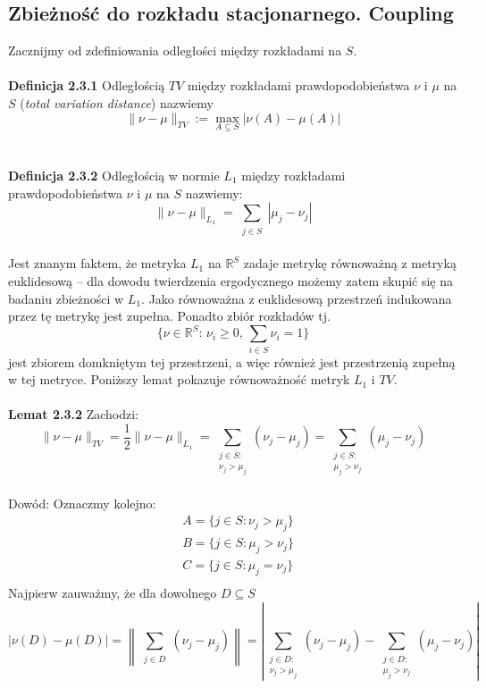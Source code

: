 \documentclass[a4paper]{article}
\begin{document}
\subsection{Zbieżność do rozkładu stacjonarnego. Coupling}
Zacznijmy od zdefiniowania odległości między rozkładami na $S$.\\\\
\textbf{Definicja 2.3.1}
Odległością $TV$ między rozkładami prawdopodobieństwa $\nu$ i $\mu$ na $S$ (\textit{total variation distance}) nazwiemy $$\|\nu - \mu\|_{TV} := \max\limits_{A \subseteq S} |\nu(A) - \mu(A)|$$\\
\\
\textbf{Definicja 2.3.2}
Odległością w normie $L_1$ między rozkładami prawdopodobieństwa $\nu$ i $\mu$ na $S$ nazwiemy:
$$\|\nu - \mu\|_{L_1} = \sum\limits_{\substack{j \in S}} |\mu_j - \nu_j|$$
\\
Jest znanym faktem, że metryka $L_1$ na $\mathbb{R}^S$ zadaje metrykę równoważną z metryką euklidesową – dla dowodu twierdzenia ergodycznego możemy zatem skupić się na badaniu zbieżności w $L_1$. Jako równoważna z euklidesową przestrzeń indukowana przez tę metrykę jest zupełna. Ponadto zbiór rozkładów tj. 
$$\{\nu \in \mathbb{R}^S:\, \nu_i \geq 0, \, \sum\limits_{i \in S} \nu_i = 1\}$$ 
jest zbiorem domkniętym tej przestrzeni, a więc również jest przestrzenią zupełną w tej metryce. Poniższy lemat pokazuje równoważność metryk $L_1$ i $TV$.
\\\\
\textbf{Lemat 2.3.2}
Zachodzi: 
$$\|\nu - \mu\|_{TV} = \frac{1}{2}\|\nu - \mu\|_{L_1} = \sum\limits_{\substack{j \in S:\\ \nu_j > \mu_j}} (\nu_j - \mu_j) = \sum\limits_{\substack{j \in S:\\ \mu_j > \nu_j}} (\mu_j - \nu_j)$$
\\
Dowód: Oznaczmy kolejno: \begin{align*}
&A = \{j \in S: \nu_j > \mu_j\}\\
&B = \{j \in S: \mu_j > \nu_j\}\\
&C = \{j \in S: \mu_j = \nu_j\}\\
\end{align*}
Najpierw zauważmy, że dla dowolnego $D \subseteq S$ $$|\nu(D) - \mu(D)| =  \left\| \sum\limits_{\substack{j \in D}} (\nu_j - \mu_j) \right\| =  \left\lvert \sum\limits_{\substack{j \in D:\\ \nu_j > \mu_j}} (\nu_j - \mu_j) - \sum\limits_{\substack{j \in D:\\ \mu_j > \nu_j}} (\mu_j - \nu_j) \right\rvert$$
\end{document}
